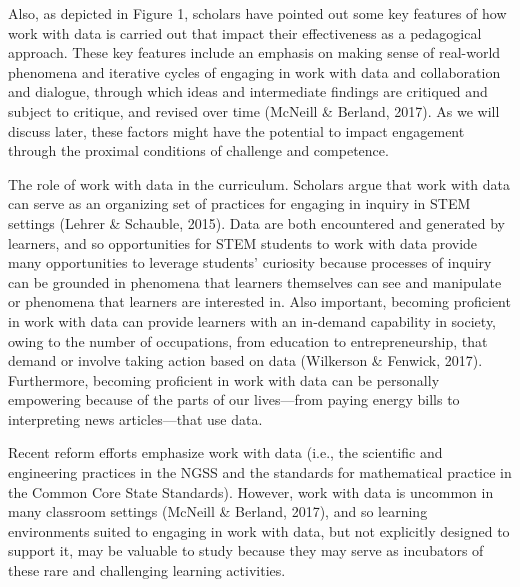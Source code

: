 \documentclass[]{book}
\theoremstyle{definition}
\theoremstyle{definition}
\theoremstyle{definition}
\theoremstyle{remark}
\begin{document}
Also, as depicted in Figure 1, scholars have pointed out some key
features of how work with data is carried out that impact their
effectiveness as a pedagogical approach. These key features include an
emphasis on making sense of real-world phenomena and iterative cycles of
engaging in work with data and collaboration and dialogue, through which
ideas and intermediate findings are critiqued and subject to critique,
and revised over time (McNeill \& Berland, 2017). As we will discuss
later, these factors might have the potential to impact engagement
through the proximal conditions of challenge and competence.

The role of work with data in the curriculum. Scholars argue that work
with data can serve as an organizing set of practices for engaging in
inquiry in STEM settings (Lehrer \& Schauble, 2015). Data are both
encountered and generated by learners, and so opportunities for STEM
students to work with data provide many opportunities to leverage
students' curiosity because processes of inquiry can be grounded in
phenomena that learners themselves can see and manipulate or phenomena
that learners are interested in. Also important, becoming proficient in
work with data can provide learners with an in-demand capability in
society, owing to the number of occupations, from education to
entrepreneurship, that demand or involve taking action based on data
(Wilkerson \& Fenwick, 2017). Furthermore, becoming proficient in work
with data can be personally empowering because of the parts of our
lives---from paying energy bills to interpreting news articles---that
use data.

Recent reform efforts emphasize work with data (i.e., the scientific and
engineering practices in the NGSS and the standards for mathematical
practice in the Common Core State Standards). However, work with data is
uncommon in many classroom settings (McNeill \& Berland, 2017), and so
learning environments suited to engaging in work with data, but not
explicitly designed to support it, may be valuable to study because they
may serve as incubators of these rare and challenging learning
activities.
\end{document}
